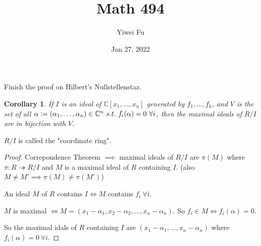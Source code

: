 \documentclass{article}
\newcommand{\C}{\mathbb{C}}
\newcommand{\st}{\ s.t.\ }
\newcommand{\defeq}{\vcentcolon=}
\newtheorem*{corollary}{Corollary}
\theoremstyle{definition}
\theoremstyle{remark}
\begin{document}
\title{Math 494}
\author{Yiwei Fu}
\date{Jan 27, 2022}
\maketitle

Finish the proof on Hilbert's Nullstellenstaz.
\begin{corollary}
    If $I$ is an ideal of $\C[x_1, \ldots, x_n]$ generated by $f_1, \ldots, f_k$, and $V$ is the set of all $\alpha \defeq (\alpha_1, \ldots, \alpha_n) \in \C^n \st f_i(\alpha) = 0\ \forall i$, then the maximal ideals of $R/I$ are in bijection with $V$.
\end{corollary}
$R/I$ is called the "coordinate ring".
\begin{proof}
    Correpondence Theorem $\implies$ maximal ideals of $R/I$ are $\pi(M)$ where $\pi: R \twoheadrightarrow R/I$ and $M$ is a maximal ideal of $R$ containing $I$. (also $M \neq M' \implies \pi(M) \neq \pi(M')$)

    An ideal $M$ of $R$ contains $I \iff M$ contains $f_i\ \forall i$.

    $M$ is maximal $\iff M = (x_1 - \alpha_1, x_2 - \alpha_2, \ldots, x_n - \alpha_n)$. So $f_i \in M \iff f_i(\alpha) = 0$.

    So the maximal idals of $R$ containing $I$ are $(x_1 - \alpha_1, \ldots, x_n - \alpha_n)$ where $f_i(\alpha) = 0\ \forall i$.
\end{proof}
\end{document}
